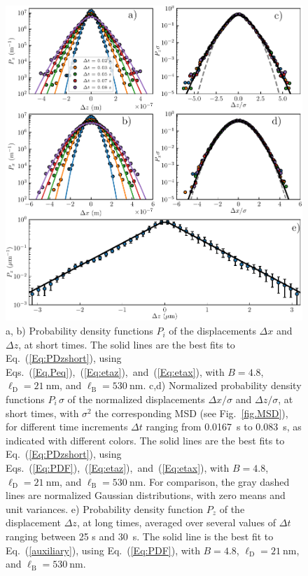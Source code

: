 \begin{figure}[H]
	\centering
	\includegraphics{02_body/chapter3/images/trajctory_analysis/P_displacement.pdf}
	\caption{a, b) Probability density functions $P_i$ of the displacements $\Delta x$ and $\Delta z$, at short times. The solid lines are the best fits to Eq.~(\ref{Eq:PDzshort}), using Eqs.~(\ref{Eq.Peq}),~(\ref{Eq:etaz}),~and~(\ref{Eq:etax}), with $B = 4.8$, $\ell_\mathrm{D} = 21 ~ \mathrm{nm}$, and $\ell_\mathrm{B} = 530~\mathrm{nm}$. c,d) Normalized probability density functions $P_i\,\sigma$ of the normalized displacements $\Delta x/\sigma$ and $\Delta z/\sigma$, at short times, with $\sigma^2$ the corresponding MSD (see Fig.~\ref{fig.MSD}), for different time increments $\Delta t$ ranging from 0.0167~s to 0.083~s, as indicated with different colors. The solid lines are the best fits to Eq.~(\ref{Eq:PDzshort}), using Eqs.~(\ref{Eq:PDF}),~(\ref{Eq:etaz}),~and~(\ref{Eq:etax}), with $B = 4.8$, $\ell_\mathrm{D} = 21 ~ \mathrm{nm}$, and $\ell_\mathrm{B} = 530~\mathrm{nm}$. For comparison, the gray dashed lines are normalized Gaussian distributions, with zero means and unit variances. e) Probability density function $P_z$ of the displacement $\Delta z$, at long times, averaged over several values of $\Delta t$ ranging between 25 s and 30~s. The solid line is the best fit to Eq.~(\ref{auxiliary}), using Eq.~(\ref{Eq:PDF}), with $B = 4.8$, $\ell_\mathrm{D} = 21 ~ \mathrm{nm}$, and $\ell_\mathrm{B} = 530~\mathrm{nm}$.}
	\label{fig.displacement}
\end{figure}



